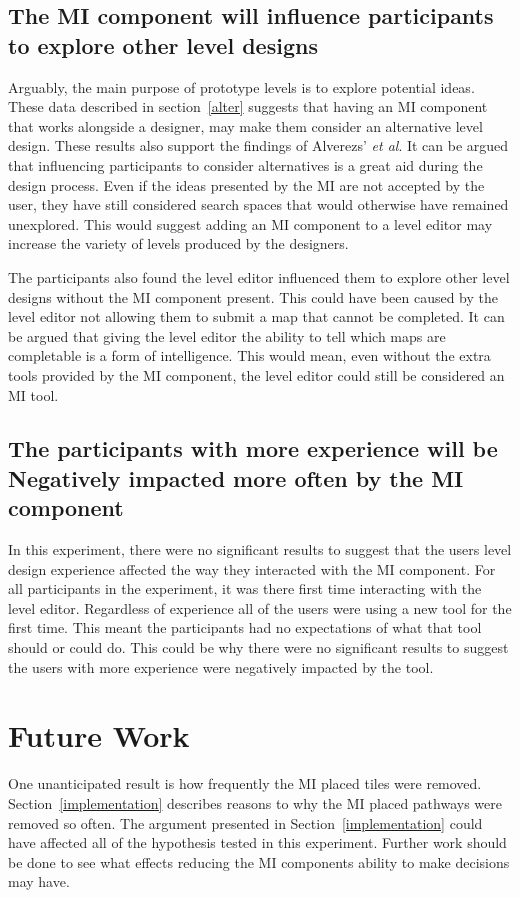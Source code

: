 \documentclass[journal]{IEEEtran}
\begin{document}
\subsection{The MI component will influence participants to explore other level designs}\label{altDiss}
Arguably, the main purpose of prototype levels is to explore potential ideas. These data described in section~\ref{alter} suggests that having an MI component that works alongside a designer, may make them consider an alternative level design. These results also support the findings of Alverezs' \textit{et al}\cite{alvarez2018fostering}. It can be argued that influencing participants to consider alternatives is a great aid during the design process. Even if the ideas presented by the MI are not accepted by the user, they have still considered search spaces that would otherwise have remained unexplored. This would suggest adding an MI component to a level editor may increase the variety of levels produced by the designers.

The participants also found the level editor influenced them to explore other level designs without the MI component present. This could have been caused by the level editor not allowing them to submit a map that cannot be completed. It can be argued that giving the level editor the ability to tell which maps are completable is a form of intelligence. This would mean, even without the extra tools provided by the MI component, the level editor could still be considered an MI tool. 

\subsection{The participants with more experience will be Negatively impacted more often by the MI component}
In this experiment, there were no significant results to suggest that the users level design experience affected the way they interacted with the MI component. For all participants in the experiment, it was there first time interacting with the level editor. Regardless of experience all of the users were using a new tool for the first time. This meant the participants had no expectations of what that tool should or could do. This could be why there were no significant results to suggest the users with more experience were negatively impacted by the tool.

\section{Future Work}
One unanticipated result is how frequently the MI placed tiles were removed. Section~\ref{implementation} describes reasons to why the MI placed pathways were removed so often. The argument presented in Section~\ref{implementation} could have affected all of the hypothesis tested in this experiment. Further work should be done to see what effects reducing the MI components ability to make decisions may have.
\end{document}
